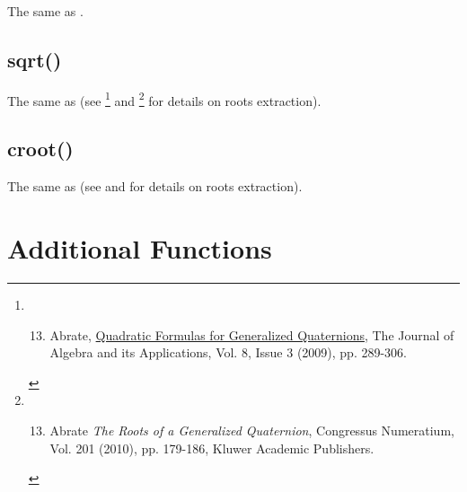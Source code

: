 \documentclass[letterpaper,10pt,english]{sphinxmanual}
\begin{document}
\begin{fulllineitems}
\end{fulllineitems}


The same as .


\subsection{sqrt()}
\label{functions:sqrt}

\begin{fulllineitems}
\end{fulllineitems}


The same as  (see \footnote{\begin{enumerate}
\setcounter{enumi}{12}
\item {} 
Abrate, \href{http://www.worldscinet.com/jaa/08/0803/S0219498809003308.html}{Quadratic Formulas for Generalized Quaternions}, The Journal of Algebra and its Applications, Vol. 8, Issue 3 (2009), pp. 289-306.

\end{enumerate}
} and \footnote{\begin{enumerate}
\setcounter{enumi}{12}
\item {} 
Abrate \emph{The Roots of a Generalized Quaternion}, Congressus Numeratium, Vol. 201 (2010), pp. 179-186, Kluwer Academic Publishers.

\end{enumerate}
} for details on roots extraction).


\subsection{croot()}
\label{functions:croot}

\begin{fulllineitems}
\end{fulllineitems}


The same as  (see \footnotemark[1] and \footnotemark[2] for details on roots extraction).


\section{Additional Functions}
\label{functions:additional-functions}
\end{document}
